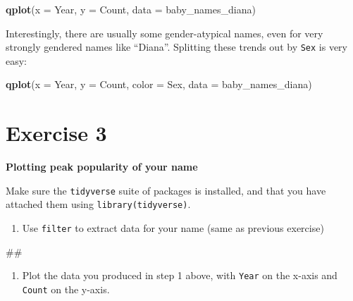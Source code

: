 \documentclass[]{book}
\newenvironment{Shaded}{\begin{snugshade}}{\end{snugshade}}
\newcommand{\KeywordTok}[1]{\textcolor[rgb]{0.13,0.29,0.53}{\textbf{#1}}}
\newcommand{\DataTypeTok}[1]{\textcolor[rgb]{0.13,0.29,0.53}{#1}}
\newcommand{\NormalTok}[1]{#1}
\providecommand{\tightlist}{%
  \setlength{\itemsep}{0pt}\setlength{\parskip}{0pt}}
\begin{document}
\begin{Shaded}
\begin{Highlighting}[]
\KeywordTok{qplot}\NormalTok{(}\DataTypeTok{x =}\NormalTok{ Year, }\DataTypeTok{y =}\NormalTok{ Count,}
     \DataTypeTok{data =}\NormalTok{ baby_names_diana)}
\end{Highlighting}
\end{Shaded}

Interestingly, there are usually some gender-atypical names, even for
very strongly gendered names like ``Diana''. Splitting these trends out
by \texttt{Sex} is very easy:

\begin{Shaded}
\begin{Highlighting}[]
\KeywordTok{qplot}\NormalTok{(}\DataTypeTok{x =}\NormalTok{ Year, }\DataTypeTok{y =}\NormalTok{ Count, }\DataTypeTok{color =}\NormalTok{ Sex,}
      \DataTypeTok{data =}\NormalTok{ baby_names_diana)}
\end{Highlighting}
\end{Shaded}

\section{Exercise 3}\label{exercise-3}

\textbf{Plotting peak popularity of your name}

Make sure the \texttt{tidyverse} suite of packages is installed, and
that you have attached them using \texttt{library(tidyverse)}.

\begin{enumerate}
\def\labelenumi{\arabic{enumi}.}
\tightlist
\item
  Use \texttt{filter} to extract data for your name (same as previous
  exercise)
\end{enumerate}

\begin{Shaded}
\begin{Highlighting}[]
\NormalTok{##}
\end{Highlighting}
\end{Shaded}

\begin{enumerate}
\def\labelenumi{\arabic{enumi}.}
\setcounter{enumi}{1}
\tightlist
\item
  Plot the data you produced in step 1 above, with \texttt{Year} on the
  x-axis and \texttt{Count} on the y-axis.
\end{enumerate}
\end{document}
